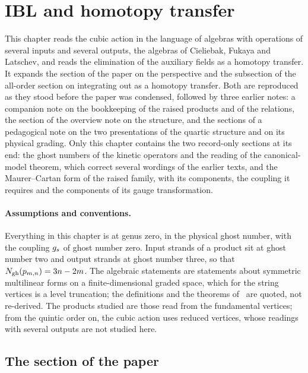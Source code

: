 \section{IBL and homotopy transfer}
\label{ch:ibl}

This chapter reads the cubic action in the language of algebras with operations of several inputs and several outputs, the \IBL{} algebras of Cieliebak, Fukaya and Latschev, and reads the elimination of the auxiliary fields as a homotopy transfer.
It expands the section of the paper on the \IBL{} perspective and the subsection of the all-order section on integrating out as a homotopy transfer.
Both are reproduced as they stood before the paper was condensed, followed by three earlier notes: a companion note on the bookkeeping of the raised products and of the \IBL{} relations, the section of the overview note on the \IBL{} structure, and the sections of a pedagogical note on the two presentations of the quartic structure and on its physical grading.
Only this chapter contains the two record-only sections at its end: the ghost numbers of the kinetic operators and the reading of the canonical-model theorem, which correct several wordings of the earlier texts, and the Maurer--Cartan form of the raised family, with its components, the coupling it requires and the components of its gauge transformation.

\paragraph{Assumptions and conventions.}

Everything in this chapter is at genus zero, in the physical ghost number, with the coupling $g_s$ of ghost number zero.
Input strands of a product sit at ghost number two and output strands at ghost number three, so that $N_{\text{gh}}(p_{m,n}) = 3 n - 2 m$.
The algebraic statements are statements about symmetric multilinear forms on a finite-dimensional graded space, which for the string vertices is a level truncation; the \IBL{} definitions and the theorems of~\cite{Cieliebak:2015:HomologicalAlgebraRelated} are quoted, not re-derived.
The products studied are those read from the fundamental vertices; from the quintic order on, the cubic action uses reduced vertices, whose readings with several outputs are not studied here.

\subsection*{The \IBL{} section of the paper}


